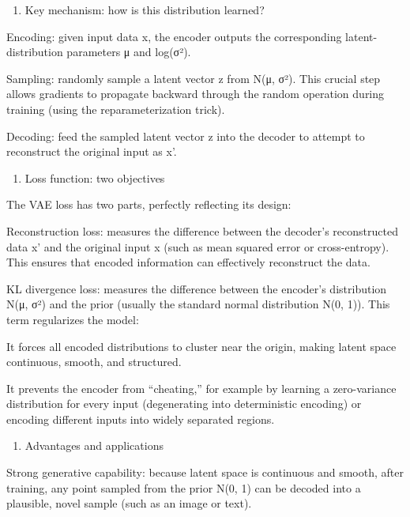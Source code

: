 \begin{enumerate}
\def\labelenumi{\arabic{enumi}.}
\setcounter{enumi}{1}
\tightlist
\item
  Key mechanism: how is this distribution learned?
\end{enumerate}

Encoding: given input data x, the encoder outputs the corresponding latent-distribution parameters μ and log(σ²).

Sampling: randomly sample a latent vector z from N(μ, σ²). This crucial step allows gradients to propagate backward through the random operation during training (using the reparameterization trick).

Decoding: feed the sampled latent vector z into the decoder to attempt to reconstruct the original input as x'.

\begin{enumerate}
\def\labelenumi{\arabic{enumi}.}
\setcounter{enumi}{2}
\tightlist
\item
  Loss function: two objectives
\end{enumerate}

The VAE loss has two parts, perfectly reflecting its design:

Reconstruction loss: measures the difference between the decoder's reconstructed data x' and the original input x (such as mean squared error or cross-entropy). This ensures that encoded information can effectively reconstruct the data.

KL divergence loss: measures the difference between the encoder's distribution N(μ, σ²) and the prior (usually the standard normal distribution N(0, 1)). This term regularizes the model:

It forces all encoded distributions to cluster near the origin, making latent space continuous, smooth, and structured.

It prevents the encoder from ``cheating,'' for example by learning a zero-variance distribution for every input (degenerating into deterministic encoding) or encoding different inputs into widely separated regions.

\begin{enumerate}
\def\labelenumi{\arabic{enumi}.}
\setcounter{enumi}{3}
\tightlist
\item
  Advantages and applications
\end{enumerate}

Strong generative capability: because latent space is continuous and smooth, after training, any point sampled from the prior N(0, 1) can be decoded into a plausible, novel sample (such as an image or text).

